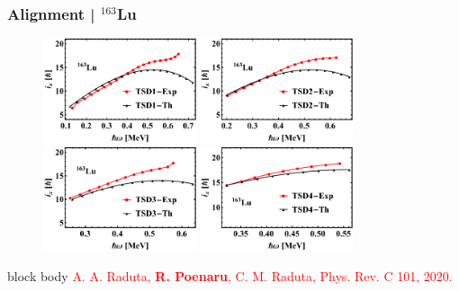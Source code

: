 \documentclass{beamer}
\begin{document}
\begin{frame}
	\frametitle{Alignment | $^{163}$Lu}
	\begin{figure}
		\centering
		\includegraphics[width=0.4\textwidth]{figures/Lu-exp-energies/fig8a_lu163.pdf}
		\includegraphics[width=0.4\textwidth]{figures/Lu-exp-energies/fig8b_lu163.pdf}
		\includegraphics[width=0.4\textwidth]{figures/Lu-exp-energies/fig8c_lu163.pdf}
		\includegraphics[width=0.4\textwidth]{figures/Lu-exp-energies/fig8d_lu163.pdf}
	\end{figure}
	\begin{beamercolorbox}[rounded=true,shadow=false, wd=\linewidth,]{block body}
		\centering
		\textcolor{red}{\footnotesize{A. A. Raduta, \textbf{R. Poenaru}, C. M. Raduta, Phys. Rev. C 101, 2020.}}
	\end{beamercolorbox}
\end{frame}
\end{document}
